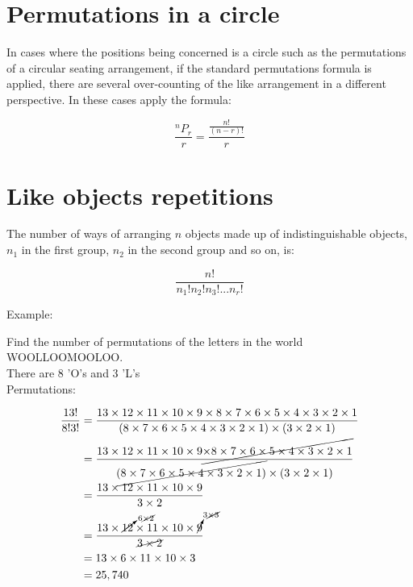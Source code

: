\documentclass{book}
\begin{document}
\section{Permutations in a circle}
In cases where the positions being concerned is a circle such as the permutations of a circular seating arrangement, if the standard permutations formula is applied, there are several over-counting of the like arrangement in a different perspective.  In these cases apply the formula:

\[
	\frac{^nP_r}{r} = \frac{\frac{n!}{(n-r)!}}{r}
\]



\section{Like objects repetitions}
The number of ways of arranging $n$ objects made up of indistinguishable objects, $n_1$ in the first group, $n_2$ in the second group and so on, is:

\[
	\frac{n!}{n_1! n_2! n_3!... n_r!}
\]

Example:

\begin{center}
	Find the number of permutations of the letters in the world WOOLLOOMOOLOO.\\
	There are 8 'O's and 3 'L's\\
	Permutations:

	\begin{align*}
		\frac{13!}{8!3!} & = \frac{13 \times 12 \times 11 \times 10 \times 9 \times 8 \times 7 \times 6 \times 5 \times 4 \times 3 \times 2 \times 1}{(8 \times 7 \times 6 \times 5 \times 4 \times 3 \times 2 \times 1) \times (3 \times 2 \times 1)}                   \\
		                 & = \frac{13 \times 12 \times 11 \times 10 \times 9 \cancel{\times 8 \times 7 \times 6 \times 5 \times 4 \times 3 \times 2 \times 1}}{\cancel{(8 \times 7 \times 6 \times 5 \times 4 \times 3 \times 2 \times 1)} \times (3 \times 2 \times 1)} \\
		                 & = \frac{13 \times 12 \times 11 \times 10 \times 9}{3 \times 2}                                                                                                                                                                                \\
		                 & = \frac{13 \times \cancelto{6 \cancel{\times 2}}{12} \times 11 \times 10 \times \cancelto{3 \cancel{\times 3}}{9}}{\cancel{3 \times 2}}                                                                                                       \\
		                 & = 13 \times 6 \times 11 \times 10 \times 3                                                                                                                                                                                                    \\
		                 & = 25,740
	\end{align*}
\end{center}
\end{document}
